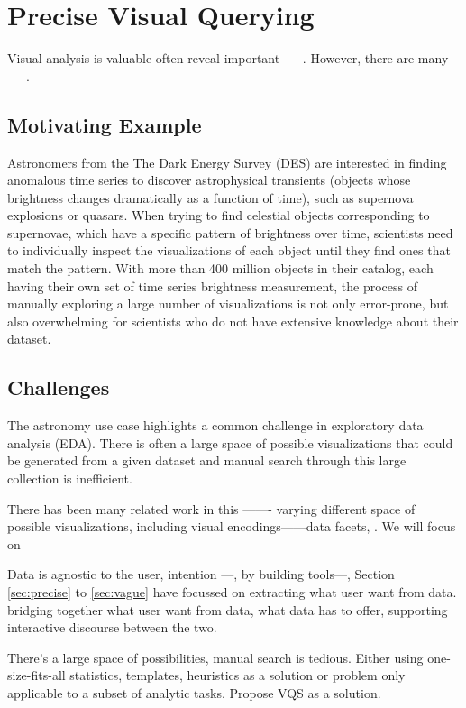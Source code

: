 \section{Precise Visual Querying\label{sec:precise}}
Visual analysis is valuable often reveal important -----. However, there are many -----. 

\subsection{Motivating Example}
Astronomers from the The Dark Energy Survey (DES)\cite{Drlica-Wagner2017} are interested in finding anomalous time series to discover astrophysical transients (objects whose brightness changes dramatically as a function of time), such as supernova explosions or quasars. When trying to find celestial objects corresponding to supernovae, which have a specific pattern of brightness over time, scientists need to individually inspect the visualizations of each object until they find ones that match the pattern. With more than 400 million objects in their catalog, each having their own set of time series brightness measurement, the process of manually exploring a large number of visualizations is not only error-prone, but also overwhelming for scientists who do not have extensive knowledge about their dataset.  

\subsection{Challenges}
\par The astronomy use case highlights a common challenge in exploratory data analysis (EDA). There is often a large space of possible visualizations that could be generated from a given dataset and manual search through this large collection is inefficient.
\par There has been many related work in this ------- varying different space of possible visualizations, including visual encodings------data facets, . We will focus on 


Data is agnostic to the user, intention ---, by building tools---, Section \ref{sec:precise} to \ref{sec:vague} have focussed on extracting what user want from data. bridging together what user want from data, what data has to offer, supporting interactive discourse between the two. 

There’s a large space of possibilities, manual search is tedious. Either using one-size-fits-all statistics, templates, heuristics as a solution or problem only applicable to a subset of analytic tasks\cite{Vartak2015,Vartak2017}. Propose VQS as a solution\cite{Lee2017}. 
